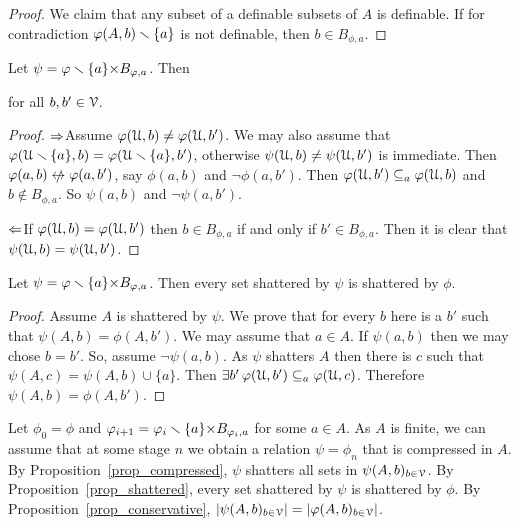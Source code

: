 \documentclass[sputnik.tex]{subfiles}
\begin{document}
\begin{proof}
We claim that any subset of a definable subsets of $A$ is definable. If for contradiction $\varphi(A,b)\smallsetminus\{a\}$ is not definable, then $b\in B_{\phi,a}$.
\end{proof}


\begin{proposition}\label{prop_conservative} Let $\psi=\varphi\smallsetminus\{a\}{\times}B_{\varphi,a}$.
Then

\hfill for all $b,b'\in\EuScript V$.
\end{proposition}

\begin{proof}
$\Rightarrow$\quad Assume $\varphi(\EuScript U,b)\neq\varphi(\EuScript U,b')$.
We may also assume that $\varphi(\EuScript U\smallsetminus\{a\},b)=\varphi(\EuScript U\smallsetminus\{a\},b')$, otherwise $\psi(\EuScript U,b)\neq\psi(\EuScript U,b')$ is immediate.
Then $\phi(a,b)\niff\phi(a,b')$, say $ \phi(a,b)$ and $\neg \phi(a,b')$.
Then $\varphi(\EuScript U,b')\subseteq_a\varphi(\EuScript U,b)$ and $b\notin B_{\phi,a}$.
So $\psi(a,b)$ and $\neg \psi(a,b')$.

$\Leftarrow$\quad If $\varphi(\EuScript U,b)=\varphi(\EuScript U,b')$ then $b\in B_{\phi,a}$ if and only if $b'\in B_{\phi,a}$.
Then it is clear that $\psi(\EuScript U,b)=\psi(\EuScript U,b')$.
\end{proof}


\begin{proposition}\label{prop_shattered} 
Let $\psi=\varphi\smallsetminus\{a\}{\times}B_{\varphi,a}$.
Then every set shattered by $\psi$ is shattered by $\phi$.
\end{proposition}

\begin{proof}
Assume $A$ is shattered by $\psi$.
We prove that for every $b$ here is a $b'$ such that $\psi(A,b)=\phi(A,b')$.
We may assume that $a\in A$.
If $\psi(a,b)$ then we may chose $b=b'$.
So, assume $\neg\psi(a,b)$.
As $\psi$ shatters $A$ then there is $c$ such that $\psi(A,c)=\psi(A,b)\cup\{a\}$.
Then $\exists b'\,\varphi(\EuScript U,b')\subseteq_a\varphi(\EuScript U,c)$.
Therefore $\psi(A,b)=\phi(A,b')$.
\end{proof}


\begin{void_thm}\label{proof2_Pajor}\rm
Let $\phi_0=\phi$ and $\varphi_{i+1}=\varphi_i\smallsetminus \{a\}{\times}B_{\varphi_i,a}$ for some $a\in A$.
As $A$ is finite, we can assume that at some stage $n$ we obtain a relation $\psi=\phi_n$ that is compressed in $A$.
By Proposition~\ref{prop_compressed}, $\psi$ shatters all sets in $\psi(A,b)_{b\in\EuScript V}$.
By Proposition~\ref{prop_shattered}, every set shattered by $\psi$ is shattered by $\phi$.
By Proposition~\ref{prop_conservative}, $|\psi(A,b)_{b\in\EuScript V}|=|\varphi(A,b)_{b\in\EuScript V}|$.\QED
\end{void_thm}
\end{document}
